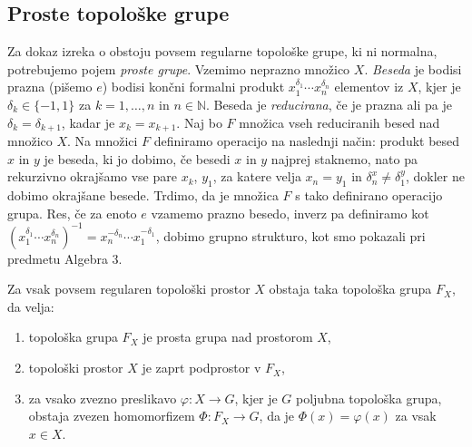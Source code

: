 \documentclass[mat1]{fmfdelo}
\newcommand{\N}{\mathbb N}
\begin{document}
\subsection{Proste topološke grupe} 
Za dokaz izreka o obstoju povsem regularne topološke grupe, ki ni normalna, potrebujemo pojem \emph{proste grupe}. Vzemimo neprazno množico $X$. \emph{Beseda} je bodisi prazna (pišemo $e$) bodisi končni formalni produkt $x_1^{\delta_1}\cdots x_n^{\delta_n}$ elementov iz $X$, kjer je $\delta_k \in \lbrace -1, 1\rbrace$ za $k = 1,\dots,n$ in $n \in \N$. Beseda je \emph{reducirana}, če je prazna ali pa je $\delta_k = \delta_{k+1}$, kadar je $x_k = x_{k+1}$. Naj bo $F$ množica vseh reduciranih besed nad množico $X$. Na množici $F$ definiramo operacijo na naslednji način: produkt besed $x$ in $y$ je beseda, ki jo dobimo, če besedi $x$ in $y$ najprej staknemo, nato pa rekurzivno okrajšamo vse pare $x_k$, $y_1$, za katere velja $x_n = y_1$ in $\delta_n^x \neq \delta_1^y$, dokler ne dobimo okrajšane besede. Trdimo, da je množica $F$ s tako definirano operacijo grupa. Res, če za enoto $e$ vzamemo prazno besedo, inverz pa definiramo kot $(x_1^{\delta_1}\cdots x_n^{\delta_n})^{-1} = x_n^{-\delta_n}\cdots x_1^{-\delta_1}$, dobimo grupno strukturo, kot smo pokazali pri predmetu Algebra 3.

\begin{izrek}\label{izr:prostatopgrupa}
Za vsak povsem regularen topološki prostor $X$ obstaja taka topološka grupa $F_X$, da velja:
\begin{enumerate}
	\item topološka grupa $F_X$ je prosta grupa nad prostorom $X$,\label{podtrd:prosta1}
	\item topološki prostor $X$ je zaprt podprostor v $F_X$,\label{podtrd:prosta2}
	\item za vsako zvezno preslikavo $\varphi\colon X \to G$, kjer je $G$ poljubna topološka grupa, obstaja zvezen homomorfizem $\Phi\colon F_X \to G$, da je $\Phi(x) = \varphi(x)$ za vsak $x \in X$.\label{podtrd:prosta3}
\end{enumerate}
\end{izrek}
\end{document}
